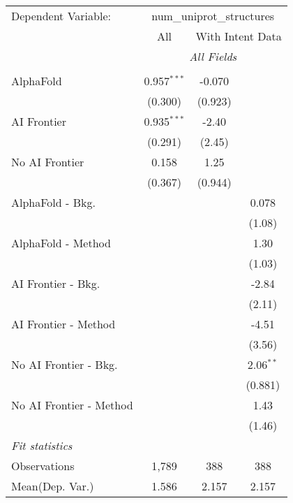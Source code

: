 \begingroup
\centering
\begin{tabular}{lccc}
   \tabularnewline \midrule \midrule
   Dependent Variable: & \multicolumn{3}{c}{num\_uniprot\_structures}\\
 & \multicolumn{1}{c}{All} & \multicolumn{2}{c}{With Intent Data} \\
\cmidrule(lr){2-2} \cmidrule(lr){3-4}
 & \multicolumn{3}{c}{\textit{All Fields}} \\ \\
   AlphaFold               & 0.957$^{***}$ & -0.070  &   \\   
                           & (0.300)       & (0.923) &   \\   
   AI Frontier             & 0.935$^{***}$ & -2.40   &   \\   
                           & (0.291)       & (2.45)  &   \\   
   No AI Frontier          & 0.158         & 1.25    &   \\   
                           & (0.367)       & (0.944) &   \\   
   AlphaFold - Bkg.        &               &         & 0.078\\   
                           &               &         & (1.08)\\   
   AlphaFold - Method      &               &         & 1.30\\   
                           &               &         & (1.03)\\   
   AI Frontier - Bkg.      &               &         & -2.84\\   
                           &               &         & (2.11)\\   
   AI Frontier - Method    &               &         & -4.51\\   
                           &               &         & (3.56)\\   
   No AI Frontier - Bkg.   &               &         & 2.06$^{**}$\\   
                           &               &         & (0.881)\\   
   No AI Frontier - Method &               &         & 1.43\\   
                           &               &         & (1.46)\\   
   \midrule
   \emph{Fit statistics}\\
   Observations            & 1,789         & 388     & 388\\  
Mean(Dep. Var.) & 1.586 & 2.157 & 2.157 \\
   

\end{tabular}
